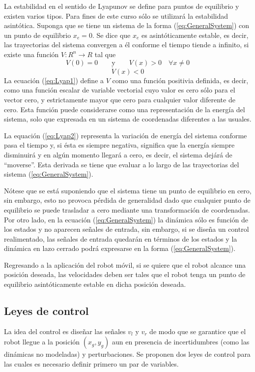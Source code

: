 \documentclass[letterpaper,12pt]{article}
\begin{document}
La estabilidad en el sentido de Lyapunov se define para puntos de equilibrio y existen varios tipos. Para fines de este curso sólo se utilizará la estabilidad asintótica. Suponga que se tiene un sistema de la forma (\ref{eq:GeneralSystem}) con un punto de equilibrio $x_e = 0$. Se dice que $x_e$ es asintóticamente estable, es decir, las trayectorias del sistema convergen a él conforme el tiempo tiende a infinito, si existe una función $V:R^n \rightarrow R$ tal que 
\begin{equation}
V(0) = 0 \qquad\textrm{y}\qquad V(x) > 0 \quad\forall x\neq 0 \label{eq:Lyap1}
\end{equation}
\begin{equation}
\dot{V}(x) < 0 \label{eq:Lyap2}
\end{equation}
La ecuación (\ref{eq:Lyap1}) define a $V$ como una función positivia definida, es decir, como una función escalar de variable vectorial cuyo valor es cero sólo para el vector cero, y estrictamente mayor que cero para cualquier valor diferente de cero. Esta función puede considerarse como una representación de la energía del sistema, solo que expresada en un sistema de coordenadas diferentes a las usuales. 

La equación (\ref{eq:Lyap2}) representa la variación de energía del sistema conforme pasa el tiempo y, si ésta es siempre negativa, significa que la energía siempre disminuirá y en algún momento llegará a cero, es decir, el sistema dejárá de ``moverse''. Esta derivada se tiene que evaluar a lo largo de las trayectorias del sistema (\ref{eq:GeneralSystem}). 

Nótese que se está suponiendo que el sistema tiene un punto de equilibrio en cero, sin embargo, esto no provoca pérdida de generalidad dado que cualquier punto de equilibrio se puede trasladar a cero mediante una transformación de coordenadas. Por otro lado, en la ecuación (\ref{eq:GeneralSystem}) la dinámica sólo es función de los estados y no aparecen señales de entrada, sin embargo, si se diseña un control realimentado, las señales de entrada quedarán en términos de los estados y la dinámica en lazo cerrado podrá expresarse en la forma (\ref{eq:GeneralSystem}). 

Regresando a la aplicación del robot móvil, si se quiere que el robot alcance una posición deseada, las velocidades deben ser tales que el robot tenga un punto de equilibrio asintóticamente estable en dicha posición deseada. 

\subsection{Leyes de control}
La idea del control es diseñar las señales $v_l$ y $v_r$ de modo que se garantice que el robot llegue a la posición $\left(x_g, y_g\right)$ aun en presencia de incertidumbres (como las dinámicas no modeladas) y perturbaciones. Se proponen dos leyes de control para las cuales es necesario definir primero un par de variables.
\end{document}
